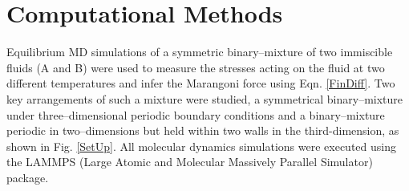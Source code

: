 \section{Computational Methods}

Equilibrium MD simulations of a symmetric binary--mixture of two immiscible fluids (A and B) were used to measure the stresses acting on the fluid at two different temperatures and infer the Marangoni force using Eqn. \ref{FinDiff}.
Two key arrangements of such a mixture were studied, a symmetrical binary–mixture under three--dimensional periodic boundary conditions and a binary--mixture periodic in two--dimensions but held within two walls in the third-dimension, as shown in Fig. \ref{SetUp}.
All molecular dynamics simulations were executed using the LAMMPS (Large Atomic and Molecular Massively Parallel Simulator) package.\cite{LAMMPS}  

